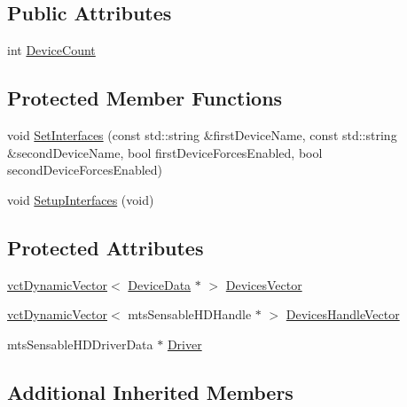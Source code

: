 \subsection*{Public Attributes}
\begin{DoxyCompactItemize}
\item 
int \hyperlink{classmts_sensable_h_d_a75a41334d77a8db7e0913e9d5ca0483d}{Device\+Count}
\end{DoxyCompactItemize}
\subsection*{Protected Member Functions}
\begin{DoxyCompactItemize}
\item 
void \hyperlink{classmts_sensable_h_d_ada94e86f257a11e1df347dc003eb0bba}{Set\+Interfaces} (const std\+::string \&first\+Device\+Name, const std\+::string \&second\+Device\+Name, bool first\+Device\+Forces\+Enabled, bool second\+Device\+Forces\+Enabled)
\item 
void \hyperlink{classmts_sensable_h_d_a4bb52aba80991b43e4692fdbbdf97e6b}{Setup\+Interfaces} (void)
\end{DoxyCompactItemize}
\subsection*{Protected Attributes}
\begin{DoxyCompactItemize}
\item 
\hyperlink{classvct_dynamic_vector}{vct\+Dynamic\+Vector}$<$ \hyperlink{structmts_sensable_h_d_1_1_device_data}{Device\+Data} $\ast$ $>$ \hyperlink{classmts_sensable_h_d_a0c8ea80df145268d76c57d99ca5820e3}{Devices\+Vector}
\item 
\hyperlink{classvct_dynamic_vector}{vct\+Dynamic\+Vector}$<$ mts\+Sensable\+H\+D\+Handle $\ast$ $>$ \hyperlink{classmts_sensable_h_d_addc29ab0005b52b7c220957338fd13b0}{Devices\+Handle\+Vector}
\item 
mts\+Sensable\+H\+D\+Driver\+Data $\ast$ \hyperlink{classmts_sensable_h_d_abdb150f4135097e1530e967a8b4c9b8c}{Driver}
\end{DoxyCompactItemize}
\subsection*{Additional Inherited Members}


